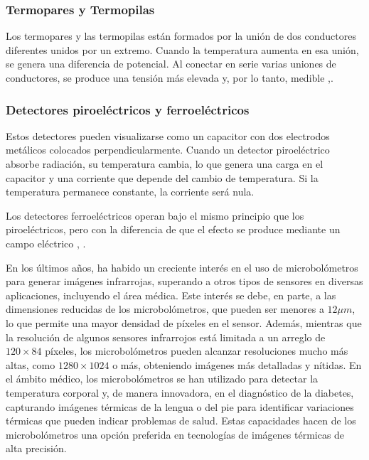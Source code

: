 		\subsubsection{Termopares y Termopilas}
		Los termopares y las termopilas están formados por la unión de dos conductores diferentes unidos por un extremo. Cuando la temperatura aumenta en esa unión, se genera una diferencia de potencial. Al conectar en serie varias uniones de conductores, se produce una tensión más elevada y, por lo tanto, medible \cite{Rogalski},\cite{Vincent}.
		
		\subsubsection{Detectores piroeléctricos y ferroeléctricos}
		Estos detectores pueden visualizarse como un capacitor con dos electrodos metálicos colocados perpendicularmente. Cuando un detector piroeléctrico absorbe radiación, su temperatura cambia, lo que genera una carga en el capacitor y una corriente que depende del cambio de temperatura. Si la temperatura permanece constante, la corriente será nula.

Los detectores ferroeléctricos operan bajo el mismo principio que los piroeléctricos, pero con la diferencia de que el efecto se produce mediante un campo eléctrico \cite{Rogalski}, \cite{BlancoMDA}.

		
En los últimos años, ha habido un creciente interés en el uso de microbolómetros para generar imágenes infrarrojas, superando a otros tipos de sensores en diversas aplicaciones, incluyendo el área médica. Este interés se debe, en parte, a las dimensiones reducidas de los microbolómetros, que pueden ser menores a $12 \mu m$, lo que permite una mayor densidad de píxeles en el sensor. Además, mientras que la resolución de algunos sensores infrarrojos está limitada a un arreglo de $120 \times 84$ píxeles, los microbolómetros pueden alcanzar resoluciones mucho más altas, como $1280 \times 1024$ o más, obteniendo imágenes más detalladas y nítidas. En el ámbito médico, los microbolómetros se han utilizado para detectar la temperatura corporal \cite{Svantner2022} y, de manera innovadora, en el diagnóstico de la diabetes, capturando imágenes térmicas de la lengua \cite{WziatekKuczmik2024} o del pie \cite{Rocha2022} para identificar variaciones térmicas que pueden indicar problemas de salud. Estas capacidades hacen de los microbolómetros una opción preferida en tecnologías de imágenes térmicas de alta precisión.
		 					          
